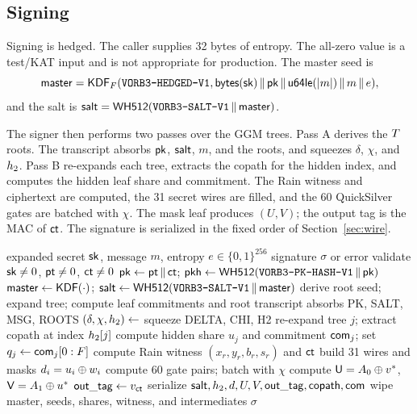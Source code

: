 \documentclass[11pt,a4paper]{article}
\begin{document}
\subsection{Signing}

Signing is hedged. The caller supplies 32 bytes of entropy. The all-zero
value is a test/KAT input and is not appropriate for production. The master
seed is
\[
\mathsf{master}=\mathsf{KDF}_F(\texttt{VORB3-HEDGED-V1},
\mathsf{bytes}(\mathsf{sk})\,\|\,\mathsf{pk}\,\|\,\mathsf{u64le}(|m|)\,\|\, m\,\|\, e),
\]
and the salt is
$\mathsf{salt}=\mathsf{WH512}(\texttt{VORB3-SALT-V1}\,\|\,\mathsf{master})$.

The signer then performs two passes over the GGM trees. Pass A derives the
$T$ roots. The transcript absorbs $\mathsf{pk}$, $\mathsf{salt}$, $m$, and the roots,
and squeezes $\delta$, $\chi$, and $h_2$. Pass B re-expands each tree,
extracts the copath for the hidden index, and computes the hidden leaf share
and commitment. The Rain witness and ciphertext are computed, the 31 secret
wires are filled, and the 60 QuickSilver gates are batched with $\chi$. The
mask leaf produces $(U,V)$; the output tag is the MAC of $\mathsf{ct}$. The signature
is serialized in the fixed order of Section~\ref{sec:wire}.

\begin{algorithm}[ht]
\small
\caption{$\Sign(\sk,m,e)$ (informative)}
\label{alg:sign}
\begin{algorithmic}[1]
\REQUIRE expanded secret $\mathsf{sk}$, message $m$, entropy $e\in\{0,1\}^{256}$
\ENSURE signature $\sigma$ or error
\STATE validate $\mathsf{sk}\ne0$, $\mathsf{pt}\ne0$, $\mathsf{ct}\ne0$
\STATE $\mathsf{pk}\gets\mathsf{pt}\,\|\,\mathsf{ct}$; $\mathsf{pkh}\gets\mathsf{WH512}(\texttt{VORB3-PK-HASH-V1}\,\|\,\mathsf{pk})$
\STATE $\mathsf{master}\gets\mathsf{KDF}(\cdot)$; $\mathsf{salt}\gets\mathsf{WH512}(\texttt{VORB3-SALT-V1}\,\|\,\mathsf{master})$
  \STATE derive root seed; expand tree; compute leaf commitments and root
\ENDFOR
\STATE transcript absorbs PK, SALT, MSG, ROOTS
\STATE $(\delta,\chi,h_2)\gets$ squeeze DELTA, CHI, H2
  \STATE re-expand tree $j$; extract copath at index $h_2[j]$
  \STATE compute hidden share $u_j$ and commitment $\mathsf{com}_j$; set $q_j\gets\mathsf{com}_j[0:F]$
\ENDFOR
\STATE compute Rain witness $(x_r,y_r,b_r,s_r)$ and $\mathsf{ct}$
\STATE build 31 wires and masks $d_i=u_i\oplus w_i$
\STATE compute 60 gate pairs; batch with $\chi$
\STATE compute $\mathsf{U}=A_0\oplus v^\ast$, $\mathsf{V}=A_1\oplus u^\ast$
\STATE $\mathsf{out\_tag}\gets v_{\mathsf{ct}}$
\STATE serialize $\mathsf{salt},h_2,d,U,V,\mathsf{out\_tag},\mathsf{copath},\mathsf{com}$
\STATE wipe master, seeds, shares, witness, and intermediates
\RETURN $\sigma$
\end{algorithmic}
\end{algorithm}
\end{document}
